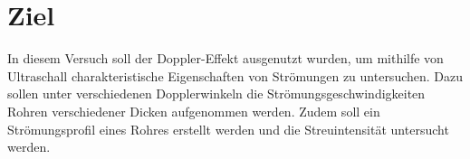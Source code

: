 \section{Ziel}
\label{sec:Ziel}
In diesem Versuch soll der Doppler-Effekt ausgenutzt wurden, um mithilfe
von Ultraschall charakteristische Eigenschaften von Strömungen zu untersuchen.
Dazu sollen unter verschiedenen Dopplerwinkeln die Strömungsgeschwindigkeiten
Rohren verschiedener Dicken aufgenommen werden. Zudem soll ein Strömungsprofil
eines Rohres erstellt werden und die Streuintensität untersucht werden.
